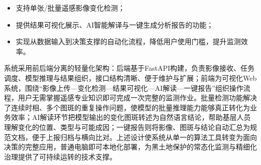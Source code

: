\begin{itemize}
    \item 支持单张/批量遥感影像变化检测；
    \item 提供结果可视化展示、AI智能解译与一键生成分析报告的功能；
    \item 实现从数据输入到决策支撑的自动化流程，降低用户使用门槛，提升监测效率。
\end{itemize}

系统采用前后端分离的轻量化架构：后端基于FastAPI构建，负责影像接收、任务调度、模型推理与结果组织，接口结构清晰、便于维护与扩展；前端为可视化Web系统，围绕“影像上传—变化检测—结果可视化—AI解读—一键报告”组织操作流程，用户无需掌握遥感专业知识即可完成一次完整的监测作业。批量检测功能解决了连续时相、多个图斑的重复操作问题，使模型的批量推理能力能够真正转化为业务效率；AI解读环节把模型输出的变化图斑转述为自然语言结论，帮助基层人员理解变化的位置、类型与可能成因；一键报告则将影像、图斑与结论自动汇总为规范文档，便于上报归档与横向比对。上述设计使系统从单一的算法工具转变为面向决策的完整应用，普通电脑即可本地化部署，为黑土地保护的常态化监测与精细化治理提供了可持续运转的技术支撑。
